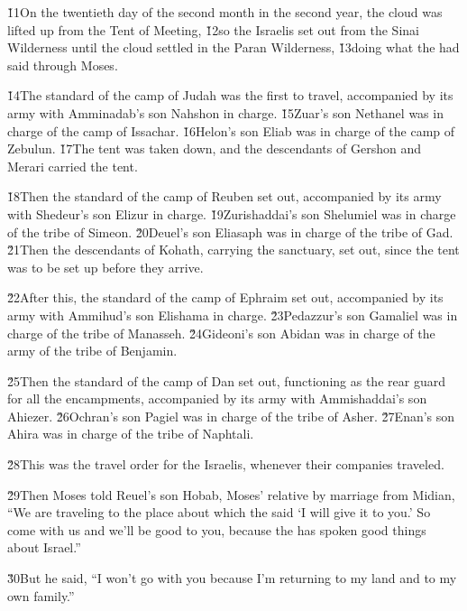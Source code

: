 \v{11}On the twentieth day of the second month in the second year, the cloud was lifted up from the Tent of Meeting, \v{12}so the Israelis set out from the Sinai Wilderness until the cloud settled in the Paran Wilderness, \v{13}doing what the  had said through Moses.

\v{14}The standard of the camp of Judah was the first to travel, accompanied by its army with Amminadab's son Nahshon in charge. \v{15}Zuar's son Nethanel was in charge of the camp of Issachar. \v{16}Helon's son Eliab was in charge of the camp of Zebulun. \v{17}The tent was taken down, and the descendants of Gershon and Merari carried the tent.

\v{18}Then the standard of the camp of Reuben set out, accompanied by its army with Shedeur's son Elizur in charge. \v{19}Zurishaddai's son Shelumiel was in charge of the tribe of Simeon. \v{20}Deuel's son Eliasaph was in charge of the tribe of Gad. \v{21}Then the descendants of Kohath, carrying the sanctuary, set out, since the tent was to be set up before they arrive.

\v{22}After this, the standard of the camp of Ephraim set out, accompanied by its army with Ammihud's son Elishama in charge. \v{23}Pedazzur's son Gamaliel was in charge of the tribe of Manasseh. \v{24}Gideoni's son Abidan was in charge of the army of the tribe of Benjamin.

\v{25}Then the standard of the camp of Dan set out, functioning as the rear guard for all the encampments, accompanied by its army with Ammishaddai's son Ahiezer. \v{26}Ochran's son Pagiel was in charge of the tribe of Asher. \v{27}Enan's son Ahira was in charge of the tribe of Naphtali.

\v{28}This was the travel order for the Israelis, whenever their companies traveled.

\v{29}Then Moses told Reuel's son Hobab, Moses' relative by marriage from Midian, ``We are traveling to the place about which the  said `I will give it to you.' So come with us and we'll be good to you, because the  has spoken good things about Israel.''

\v{30}But he said, ``I won't go with you because I'm returning to my land and to my own family.''

